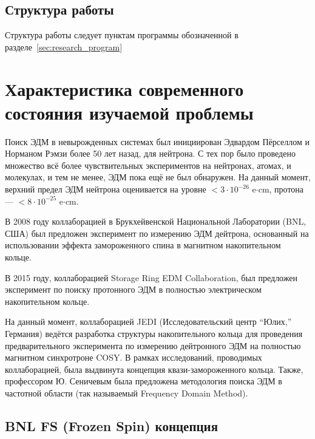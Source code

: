 \documentclass{report}
\begin{document}
\section{Структура работы}
Структура работы следует пунктам программы обозначенной в разделе~\ref{sec:research_program}

\chapter{Характеристика современного состояния изучаемой проблемы}
Поиск ЭДМ в невырожденных системах был инициирован Эдвардом Пёрселлом
и Норманом Рэмзи более 50 лет назад, для нейтрона. С тех пор было
проведено множество всё более чувствительных экспериментов на
нейтронах, атомах, и молекулах, и тем не менее, ЭДМ пока ещё не был
обнаружен. На данный момент, верхний предел ЭДМ нейтрона оценивается
на уровне $<3\cdot 10^{-26}$ e$\cdot$cm, протона --- $<8\cdot
10^{-25}$ e$\cdot$cm.~\citep[стр.~9]{Pretz_presentation}

В 2008 году коллаборацией в Брукхейвенской Национальной Лаборатории (BNL, США) был предложен эксперимент по измерению ЭДМ дейтрона, основанный на использовании эффекта замороженного спина в магнитном накопительном кольце.~\cite{BNL:Deuteron2008} 

В 2015 году, коллаборацией Storage Ring EDM Collaboration, был предложен эксперимент по поиску протонного ЭДМ в полностью электрическом накопительном кольце.~\cite{BNL:Proton}

На данный момент, коллаборацией JEDI (Исследовательский центр ``Юлих,'' Германия) ведётся разработка структуры накопительного кольца для проведения предварительного эксперимента по измерению дейтронного ЭДМ на полностью магнитном синхротроне COSY. В рамках исследований, проводимых коллаборацией, была выдвинута концепция квази-замороженного кольца. Также, профессором Ю. Сеничевым была предложена методология поиска ЭДМ в частотной области (так называемый Frequency Domain Method).

\section{BNL FS (Frozen Spin) концепция}
\end{document}

